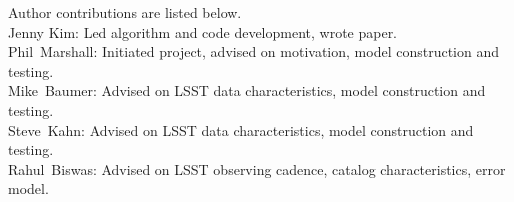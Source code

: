 Author contributions are listed below. \\
Jenny Kim: Led algorithm and code development, wrote paper. \\
Phil~Marshall: Initiated  project, advised on motivation, model construction and testing. \\
Mike~Baumer: Advised on LSST data characteristics, model construction and testing. \\
Steve~Kahn: Advised on LSST data characteristics, model construction and testing. \\
Rahul~Biswas: Advised on LSST observing cadence, catalog characteristics, error model. \\
